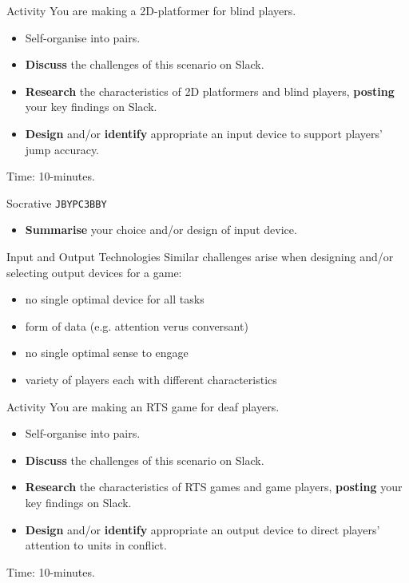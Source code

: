 \begin{frame}{Activity}
	You are making a 2D-platformer for blind players.
	
	\begin{itemize}
		\item Self-organise into pairs.
		\item \textbf{Discuss} the challenges of this scenario on Slack.
		\item \textbf{Research} the characteristics of 2D platformers and blind players, \textbf{posting} your key findings on Slack.
		\item \textbf{Design} and/or \textbf{identify} appropriate an input device to support players' jump accuracy.
	\end{itemize}
	
	\vspace{2ex}
	
	Time: 10-minutes.
\end{frame}

\begin{frame}[fragile]{Socrative \texttt{JBYPC3BBY}}
	\begin{itemize}
		\item \textbf{Summarise} your choice and/or design of input device.
	\end{itemize}
\end{frame}

\begin{frame}{Input and Output Technologies}
	Similar challenges arise when designing and/or selecting output devices for a game:
	
	\begin{itemize}
		\item no single optimal device for all tasks 
		\item form of data (e.g. attention verus conversant)
		\item no single optimal sense to engage
		\item variety of players each with different characteristics
	\end{itemize}
\end{frame}

\begin{frame}{Activity}
	You are making an RTS game for deaf players.
	
	\begin{itemize}
		\item Self-organise into pairs.
		\item \textbf{Discuss} the challenges of this scenario on Slack.
		\item \textbf{Research} the characteristics of RTS games and game players, \textbf{posting} your key findings on Slack.
		\item \textbf{Design} and/or \textbf{identify} appropriate an output device to direct players' attention to units in conflict.
	\end{itemize}
	
	\vspace{2ex}
	
	Time: 10-minutes.
\end{frame}

